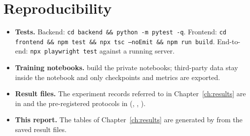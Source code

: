 \begingroup\let\clearpage\relax\let\cleardoublepage\relax\chapter{Reproducibility}\label{app:repro}\endgroup
\begin{itemize}
\item \textbf{Tests.} Backend: \texttt{cd backend \&\& python -m pytest -q}. Frontend: \texttt{cd frontend \&\& npm test \&\& npx tsc --noEmit \&\& npm run build}. End-to-end: \texttt{npx playwright test} against a running server.
\item \textbf{Training notebooks.}  build the private notebooks; third-party data stay inside the notebook and only checkpoints and metrics are exported.
\item \textbf{Result files.} The experiment records referred to in Chapter~\ref{ch:results} are in  and the pre-registered protocols in 
(, , ).
\item \textbf{This report.} The tables of Chapter~\ref{ch:results} are generated by  from the saved result files.
\end{itemize}
